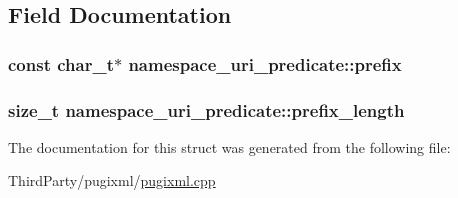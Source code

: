\subsection{Field Documentation}
\hypertarget{structnamespace__uri__predicate_a80a2c051b9e57b8895c28d8fcc32e051}{
\subsubsection[{prefix}]{\setlength{\rightskip}{0pt plus 5cm}const char\-\_\-t$\ast$ namespace\-\_\-uri\-\_\-predicate\-::prefix}}\label{structnamespace__uri__predicate_a80a2c051b9e57b8895c28d8fcc32e051}
\hypertarget{structnamespace__uri__predicate_aa48279192e8d48b9c798f5485a2a9170}{
\subsubsection[{prefix\-\_\-length}]{\setlength{\rightskip}{0pt plus 5cm}size\-\_\-t namespace\-\_\-uri\-\_\-predicate\-::prefix\-\_\-length}}\label{structnamespace__uri__predicate_aa48279192e8d48b9c798f5485a2a9170}


The documentation for this struct was generated from the following file\-:\begin{DoxyCompactItemize}
\item 
Third\-Party/pugixml/\hyperlink{pugixml_8cpp}{pugixml.\-cpp}\end{DoxyCompactItemize}

